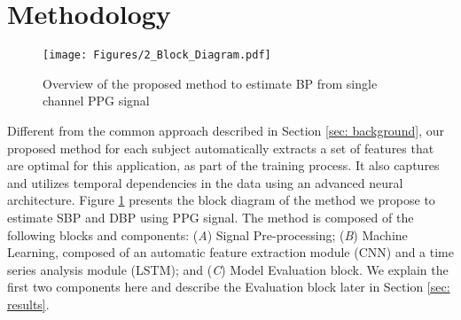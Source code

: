 \documentclass[letterpaper, 10 pt, conference]{ieeeconf}
\begin{document}
\section{Methodology} 
\label{sec: Methodology}
\begin{figure}[bt]
    \centering
    \texttt{[image: Figures/2\_Block\_Diagram.pdf]}
    \caption{Overview of the proposed method to estimate BP from single channel PPG signal}
    \label{fig: blockdiagram}
    \vspace{-2ex}
\end{figure}
Different from the common approach described in Section \ref{sec: background}, our proposed method for each subject automatically extracts a set of features that are optimal for this application, as part of the training process. It also captures and utilizes temporal dependencies in the data using an advanced neural architecture.
Figure \ref{fig: blockdiagram} presents the block diagram of the method we propose to estimate SBP and DBP using PPG signal. The method is composed of the following blocks and components:
(\emph{A}) Signal Pre-processing; (\emph{B}) Machine Learning, composed of an automatic feature extraction module (CNN) and a time series analysis module (LSTM); and (\emph{C}) Model Evaluation block. We explain the first two components here and describe the Evaluation block later in Section \ref{sec: results}.
\end{document}
